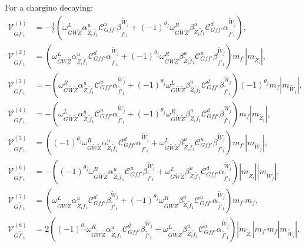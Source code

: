 \documentclass[final,3p,times]{elsarticle}
\begin{document}
For a chargino decaying:
\begin{align}
\mathcal{V}_{G \tilde{f'}_1}^{(1)} &= -\frac{1}{2}(\omega_{G \tilde{W} \tilde{Z}}^L   \alpha_{\tilde{Z}_i \tilde{f}_1}^{u}  \mathcal{C}_{G f f'}^u  \beta_{\tilde{f'}_1}^{\tilde{W}_j} +  (-1)^{\theta_f}\omega_{G \tilde{W} \tilde{Z}}^R  \beta_{\tilde{Z}_i \tilde{f}_1}^{u}  \mathcal{C}_{G f f'}^d  \alpha_{\tilde{f'}_1}^{\tilde{W}_j}), \\
\mathcal{V}_{G \tilde{f'}_1}^{(2)} &= (\omega_{G \tilde{W} \tilde{Z}}^L  \alpha_{\tilde{Z}_i \tilde{f}_1}^{u}  \mathcal{C}_{G f f'}^d  \alpha_{\tilde{f'}_1}^{\tilde{W}_j} +  (-1)^{\theta_j}\omega_{G \tilde{W} \tilde{Z}}^R  \beta_{\tilde{Z}_i \tilde{f}_1}^{u}  \mathcal{C}_{G f f'}^u  \beta_{\tilde{f'}_1}^{\tilde{W}_j})m_{f'}|m_{\tilde{Z}_i}|, \\
\mathcal{V}_{G \tilde{f'}_1}^{(3)} &= -(\omega_{G \tilde{W} \tilde{Z}}^R  \alpha_{\tilde{Z}_i \tilde{f}_1}^{u}  \mathcal{C}_{G f f'}^u  \alpha_{\tilde{f'}_1}^{\tilde{W}_j} +  (-1)^{\theta_j}\omega_{G \tilde{W} \tilde{Z}}^L  \beta_{\tilde{Z}_i \tilde{f}_1}^{u}  \mathcal{C}_{G f f'}^d  \beta_{\tilde{f'}_1}^{\tilde{W}_j})(-1)^{\theta_j} m_{f}|m_{\tilde{W}_j}|, \\
\mathcal{V}_{G \tilde{f'}_1}^{(4)} &= -(\omega_{G \tilde{W} \tilde{Z}}^L   \alpha_{\tilde{Z}_i \tilde{f}_1}^{u}  \mathcal{C}_{G f f'}^u  \alpha_{\tilde{f'}_1}^{\tilde{W}_j} +  (-1)^{\theta_j}\omega_{G \tilde{W} \tilde{Z}}^R  \beta_{\tilde{Z}_i \tilde{f}_1}^{u}  \mathcal{C}_{G f f'}^d  \beta_{\tilde{f'}_1}^{\tilde{W}_j})m_{f}|m_{\tilde{Z}_i}|, \\
\mathcal{V}_{G \tilde{f'}_1}^{(5)} &= ((-1)^{\theta_j}\omega_{G \tilde{W} \tilde{Z}}^R \alpha_{\tilde{Z}_i \tilde{f}_1}^{u}  \mathcal{C}_{G f f'}^d  \alpha_{\tilde{f'}_1}^{\tilde{W}_j} + \omega_{G \tilde{W} \tilde{Z}}^L  \beta_{\tilde{Z}_i \tilde{f}_1}^{u}  \mathcal{C}_{G f f'}^u  \beta_{\tilde{f'}_1}^{\tilde{W}_j})m_{f'} |m_{\tilde{W}_j}|,\\
\mathcal{V}_{G \tilde{f'}_1}^{(6)} &= -((-1)^{\theta_j}\omega_{G \tilde{W} \tilde{Z}}^R \alpha_{\tilde{Z}_i \tilde{f}_1}^{u}  \mathcal{C}_{G f f'}^u  \beta_{\tilde{f'}_1}^{\tilde{W}_j} + \omega_{G \tilde{W} \tilde{Z}}^L  \beta_{\tilde{Z}_i \tilde{f}_1}^{u}  \mathcal{C}_{G f f'}^d  \alpha_{\tilde{f'}_1}^{\tilde{W}_j})|m_{\tilde{Z}_i}||m_{\tilde{W}_j}| ,\\
\mathcal{V}_{G \tilde{f'}_1}^{(7)} &= (\omega_{G \tilde{W} \tilde{Z}}^L \alpha_{\tilde{Z}_i \tilde{f}_1}^{u}  \mathcal{C}_{G f f'}^d  \beta_{\tilde{f'}_1}^{\tilde{W}_j} + (-1)^{\theta_j}\omega_{G \tilde{W} \tilde{Z}}^R  \beta_{\tilde{Z}_i \tilde{f}_1}^{u} \mathcal{C}_{G f f'}^u \alpha_{\tilde{f'}_1}^{\tilde{W}_j})m_{f'}m_{f}, \\
\mathcal{V}_{G \tilde{f'}_1}^{(8)} &= 2((-1)^{\theta_j}\omega_{G \tilde{W} \tilde{Z}}^R  \alpha_{\tilde{Z}_i \tilde{f}_1}^{u}  \mathcal{C}_{G f f'}^d  \beta_{\tilde{f'}_1}^{\tilde{W}_j} + \omega_{G \tilde{W} \tilde{Z}}^L  \beta_{\tilde{Z}_i \tilde{f}_1}^{u}  \mathcal{C}_{G f f'}^u  \alpha_{\tilde{f'}_1}^{\tilde{W}_j})|m_{\tilde{Z}_i}|m_{f'}m_{f}|m_{\tilde{W}_j}|.
\end{align}
\end{document}
